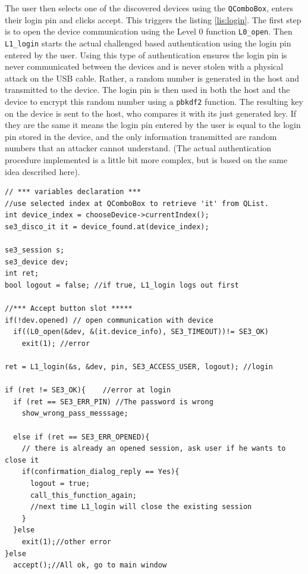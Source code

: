 The user then selects one of the discovered devices using the \texttt{QComboBox}, enters their login pin and clicks accept. This triggers the listing \ref{lis:login}. The first step is to open the device communication using the Level 0 function \texttt{L0\_open}. Then \texttt{L1\_login} starts the actual challenged based authentication using the login pin entered by the user. Using this type of authentication ensures the login pin is never communicated between the devices and is never stolen with a physical attack on the USB cable. Rather, a random number is generated in the host and transmitted to the device. The login pin is then used in both the host and the device to encrypt this random number using a \texttt{pbkdf2} function. The resulting key on the device is sent to the host, who compares it with its just generated key. If they are the same it means the login pin entered by the user is equal to the login pin stored in the device, and the only information transmitted are random numbers that an attacker cannot understand. (The actual authentication procedure implemented is a little bit more complex, but is based on the same idea described here).

\begin{lstlisting}[style=customc, float=htb, caption={Open device and try to login}, label = {lis:login}]
// *** variables declaration ***
//use selected index at QComboBox to retrieve 'it' from QList.
int device_index = chooseDevice->currentIndex();
se3_disco_it it = device_found.at(device_index);

se3_session s; 
se3_device dev;
int ret;
bool logout = false; //if true, L1_login logs out first

//*** Accept button slot *****
if(!dev.opened) // open communication with device
  if((L0_open(&dev, &(it.device_info), SE3_TIMEOUT))!= SE3_OK)
    exit(1); //error

ret = L1_login(&s, &dev, pin, SE3_ACCESS_USER, logout); //login

if (ret != SE3_OK){    //error at login
  if (ret == SE3_ERR_PIN) //The password is wrong
    show_wrong_pass_messsage;
    
  else if (ret == SE3_ERR_OPENED){
    // there is already an opened session, ask user if he wants to close it
    if(confirmation_dialog_reply == Yes){ 
      logout = true; 
      call_this_function_again;
      //next time L1_login will close the existing session
    }
  }else            
    exit(1);//other error
}else
  accept();//All ok, go to main window
\end{lstlisting}

